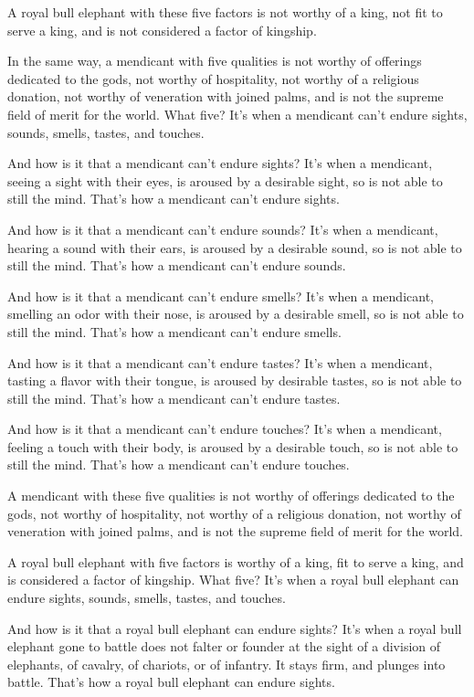 \documentclass[12pt,openany]{book}%
\begin{document}
A royal bull elephant with these five factors is not worthy of a king, not fit to serve a king, and is not considered a factor of kingship. 

In the same way, a mendicant with five qualities is not worthy of offerings dedicated to the gods, not worthy of hospitality, not worthy of a religious donation, not worthy of veneration with joined palms, and is not the supreme field of merit for the world. What five? It’s when a mendicant can’t endure sights, sounds, smells, tastes, and touches. 

And how is it that a mendicant can’t endure sights? It’s when a mendicant, seeing a sight with their eyes, is aroused by a desirable sight, so is not able to still the mind. That’s how a mendicant can’t endure sights. 

And how is it that a mendicant can’t endure sounds? It’s when a mendicant, hearing a sound with their ears, is aroused by a desirable sound, so is not able to still the mind. That’s how a mendicant can’t endure sounds. 

And how is it that a mendicant can’t endure smells? It’s when a mendicant, smelling an odor with their nose, is aroused by a desirable smell, so is not able to still the mind. That’s how a mendicant can’t endure smells. 

And how is it that a mendicant can’t endure tastes? It’s when a mendicant, tasting a flavor with their tongue, is aroused by desirable tastes, so is not able to still the mind. That’s how a mendicant can’t endure tastes. 

And how is it that a mendicant can’t endure touches? It’s when a mendicant, feeling a touch with their body, is aroused by a desirable touch, so is not able to still the mind. That’s how a mendicant can’t endure touches. 

A mendicant with these five qualities is not worthy of offerings dedicated to the gods, not worthy of hospitality, not worthy of a religious donation, not worthy of veneration with joined palms, and is not the supreme field of merit for the world. 

A royal bull elephant with five factors is worthy of a king, fit to serve a king, and is considered a factor of kingship. What five? It’s when a royal bull elephant can endure sights, sounds, smells, tastes, and touches. 

And how is it that a royal bull elephant can endure sights? It’s when a royal bull elephant gone to battle does not falter or founder at the sight of a division of elephants, of cavalry, of chariots, or of infantry. It stays firm, and plunges into battle. That’s how a royal bull elephant can endure sights. 
\end{document}
